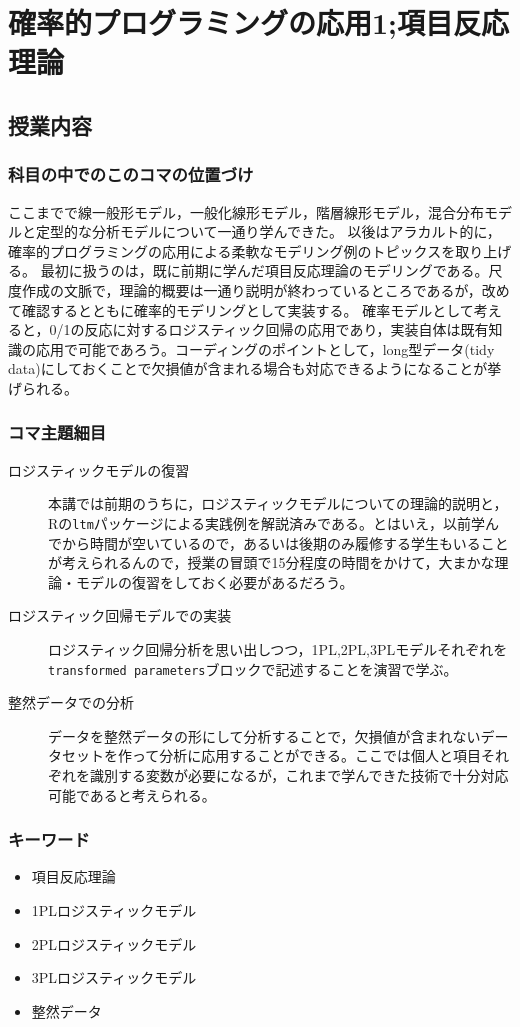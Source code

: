 \section{確率的プログラミングの応用1;項目反応理論}
\subsection{授業内容}
\subsubsection{科目の中でのこのコマの位置づけ}
ここまでで線一般形モデル，一般化線形モデル，階層線形モデル，混合分布モデルと定型的な分析モデルについて一通り学んできた。
以後はアラカルト的に，確率的プログラミングの応用による柔軟なモデリング例のトピックスを取り上げる。
最初に扱うのは，既に前期に学んだ項目反応理論のモデリングである。尺度作成の文脈で，理論的概要は一通り説明が終わっているところであるが，改めて確認するとともに確率的モデリングとして実装する。
確率モデルとして考えると，0/1の反応に対するロジスティック回帰の応用であり，実装自体は既有知識の応用で可能であろう。コーディングのポイントとして，long型データ(tidy data)にしておくことで欠損値が含まれる場合も対応できるようになることが挙げられる。
\subsubsection{コマ主題細目}
\begin{description}
	\item[ロジスティックモデルの復習] 本講では前期のうちに，ロジスティックモデルについての理論的説明と，Rの\verb|ltm|パッケージによる実践例を解説済みである。とはいえ，以前学んでから時間が空いているので，あるいは後期のみ履修する学生もいることが考えられるんので，授業の冒頭で15分程度の時間をかけて，大まかな理論・モデルの復習をしておく必要があるだろう。
	\item[ロジスティック回帰モデルでの実装] ロジスティック回帰分析を思い出しつつ，1PL,2PL,3PLモデルそれぞれを\verb|transformed parameters|ブロックで記述することを演習で学ぶ。
	\item[整然データでの分析] データを整然データの形にして分析することで，欠損値が含まれないデータセットを作って分析に応用することができる。ここでは個人と項目それぞれを識別する変数が必要になるが，これまで学んできた技術で十分対応可能であると考えられる。
\end{description}
\subsubsection{キーワード}
\begin{itemize}
	\item 項目反応理論
	\item 1PLロジスティックモデル
	\item 2PLロジスティックモデル
	\item 3PLロジスティックモデル
	\item 整然データ
\end{itemize}
